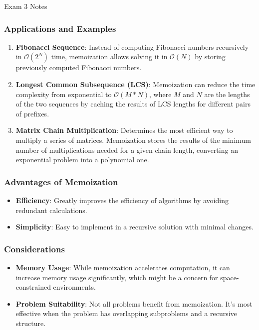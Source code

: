 \begin{examnotes}{Exam 3 Notes}
    \subsubsection*{Applications and Examples}

    \begin{enumerate}
        \item \textbf{Fibonacci Sequence}: Instead of computing Fibonacci numbers recursively in $\mathcal{O}(2^N)$ time, memoization allows solving it in $\mathcal{O}(N)$ by storing previously computed Fibonacci numbers.
        \item \textbf{Longest Common Subsequence (LCS)}: Memoization can reduce the time complexity from exponential to $\mathcal{O}(M*N)$, where $M$ and $N$ are the lengths of the two sequences by 
        caching the results of LCS lengths for different pairs of prefixes.
        \item \textbf{Matrix Chain Multiplication}: Determines the most efficient way to multiply a series of matrices. Memoization stores the results of the minimum number of multiplications needed 
        for a given chain length, converting an exponential problem into a polynomial one.
    \end{enumerate}

    \subsubsection*{Advantages of Memoization}

    \begin{itemize}
        \item \textbf{Efficiency}: Greatly improves the efficiency of algorithms by avoiding redundant calculations.
        \item \textbf{Simplicity}: Easy to implement in a recursive solution with minimal changes.
    \end{itemize}

    \subsubsection*{Considerations}

    \begin{itemize}
        \item \textbf{Memory Usage}: While memoization accelerates computation, it can increase memory usage significantly, which might be a concern for space-constrained environments.
        \item \textbf{Problem Suitability}: Not all problems benefit from memoization. It's most effective when the problem has overlapping subproblems and a recursive structure.
    \end{itemize}


\end{examnotes}
